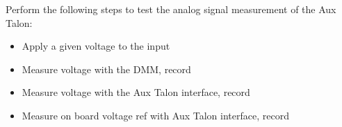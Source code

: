 Perform the following steps to test the analog signal measurement of the Aux Talon:
\begin{itemize}
\item Apply a given voltage to the input
\item Measure voltage with the DMM, record 
\item Measure voltage with the Aux Talon interface, record 
\item Measure on board voltage ref with Aux Talon interface, record 

\end{itemize}

